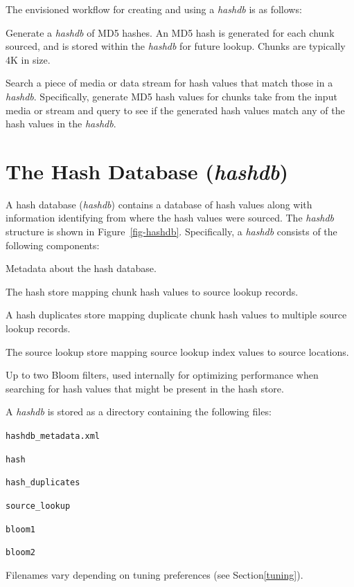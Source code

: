 \documentclass[12pt,twoside]{article}
\newcommand{\hdb}{\emph{hashdb}\xspace}
\begin{document}
The envisioned workflow for creating and using a \hdb is as follows:
\begin{compactenum}
\item Generate a \hdb of MD5 hashes.
      An MD5 hash is generated for each chunk sourced,
      and is stored within the \hdb for future lookup.
      Chunks are typically 4K in size.
\item Search a piece of media or data stream for hash values that match those in a \hdb.
      Specifically, generate MD5 hash values for chunks take from
      the input media or stream
      and query to see if the generated hash values match any of the hash values in the \hdb.
\end{compactenum}

\section{The Hash Database (\hdb)}
A hash database (\hdb) contains a database of hash values along with information
identifying from where the hash values were sourced.
The \hdb structure is shown in Figure~\ref{fig-hashdb}.
Specifically, a \hdb consists of the following components:
\begin{compactitem}
\item Metadata about the hash database.
\item The hash store mapping chunk hash values to source lookup records.
\item A hash duplicates store mapping duplicate chunk hash values to multiple source lookup records.
\item The source lookup store mapping source lookup index values to source locations.
\item Up to two Bloom filters, used internally for optimizing performance
      when searching for hash values that might be present in the hash store.
\end{compactitem}
A \hdb is stored as a directory containing the following files:
\begin{compactitem}
\item \texttt{hashdb\_metadata.xml}
\item \texttt{hash}
\item \texttt{hash\_duplicates}
\item \texttt{source\_lookup}
\item \texttt{bloom1}
\item \texttt{bloom2}
\end{compactitem}
Filenames vary depending on tuning preferences (see Section\ref{tuning}). 
\end{document}
